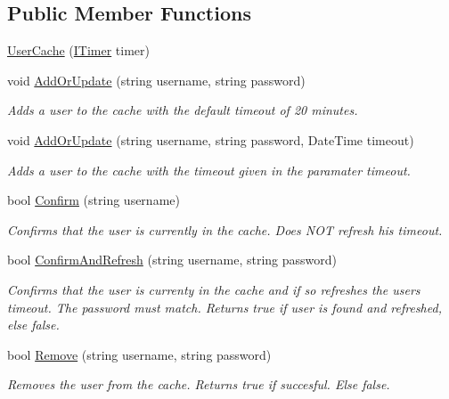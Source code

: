 \subsection*{Public Member Functions}
\begin{DoxyCompactItemize}
\item 
\mbox{\hyperlink{class_application_1_1_misc_1_1_user_cache_ab52d91840d3b6c3d4162992b35bbf3a5}{User\+Cache}} (\mbox{\hyperlink{interface_application_1_1_interfaces_1_1_i_timer}{I\+Timer}} timer)
\item 
void \mbox{\hyperlink{class_application_1_1_misc_1_1_user_cache_ab56ecb52b9a7bc855729b439a5c5bb36}{Add\+Or\+Update}} (string username, string password)
\begin{DoxyCompactList}\small\item\em Adds a user to the cache with the default timeout of 20 minutes. \end{DoxyCompactList}\item 
void \mbox{\hyperlink{class_application_1_1_misc_1_1_user_cache_a7c8d6acdc76809a72a36db8ba8fdd8f8}{Add\+Or\+Update}} (string username, string password, Date\+Time timeout)
\begin{DoxyCompactList}\small\item\em Adds a user to the cache with the timeout given in the paramater timeout. \end{DoxyCompactList}\item 
bool \mbox{\hyperlink{class_application_1_1_misc_1_1_user_cache_a77b10de2cba0f07aa9af6fd5ad53e2c6}{Confirm}} (string username)
\begin{DoxyCompactList}\small\item\em Confirms that the user is currently in the cache. Does N\+OT refresh his timeout. \end{DoxyCompactList}\item 
bool \mbox{\hyperlink{class_application_1_1_misc_1_1_user_cache_ad11a0422af31b1492098415d8e4aaad8}{Confirm\+And\+Refresh}} (string username, string password)
\begin{DoxyCompactList}\small\item\em Confirms that the user is currenty in the cache and if so refreshes the user\textquotesingle{}s timeout. The password must match. Returns true if user is found and refreshed, else false. \end{DoxyCompactList}\item 
bool \mbox{\hyperlink{class_application_1_1_misc_1_1_user_cache_af685f56bf378e2bde07f7f6f933a8e0e}{Remove}} (string username, string password)
\begin{DoxyCompactList}\small\item\em Removes the user from the cache. Returns true if succesful. Else false. \end{DoxyCompactList}\end{DoxyCompactItemize}

